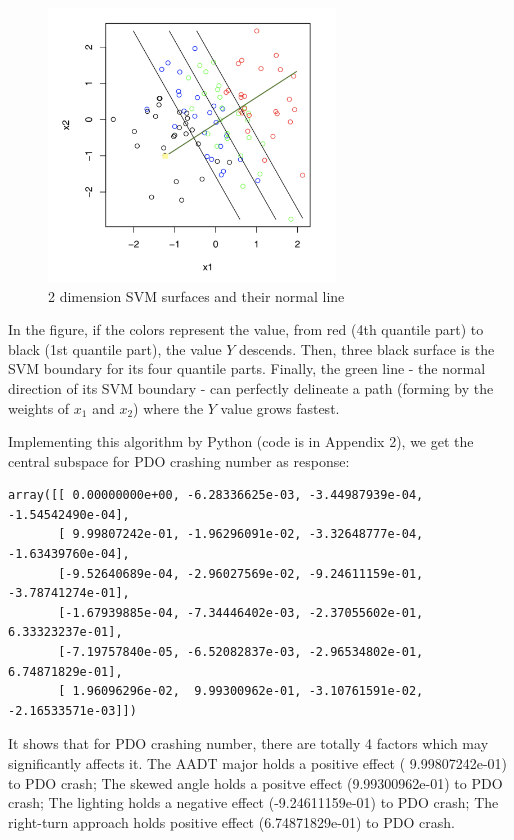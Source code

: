 \documentclass[11pt]{scrartcl} %
\begin{document}
\begin{figure}[H]
\centering
\includegraphics[width=3in]{image/psvm.png}
\small
\caption{2 dimension SVM surfaces and their normal line}
\end{figure}

In the figure, if the colors represent the value, from red (4th quantile part) to black (1st quantile part), the value $Y$ descends. Then, three black surface is the SVM boundary for its four quantile parts. Finally, the green line - the normal direction of its SVM boundary - can perfectly delineate a path (forming by the weights of $x_1$ and $x_2$) where the $Y$ value grows fastest.

\par

Implementing this algorithm by Python (code is in Appendix 2), we get the central subspace for PDO crashing number as response:

\begin{lstlisting}
array([[ 0.00000000e+00, -6.28336625e-03, -3.44987939e-04, -1.54542490e-04],
       [ 9.99807242e-01, -1.96296091e-02, -3.32648777e-04, -1.63439760e-04],
       [-9.52640689e-04, -2.96027569e-02, -9.24611159e-01, -3.78741274e-01],
       [-1.67939885e-04, -7.34446402e-03, -2.37055602e-01, 6.33323237e-01],
       [-7.19757840e-05, -6.52082837e-03, -2.96534802e-01, 6.74871829e-01],
       [ 1.96096296e-02,  9.99300962e-01, -3.10761591e-02, -2.16533571e-03]])
\end{lstlisting}

\par

It shows that for PDO crashing number, there are totally 4 factors which may significantly affects it. The AADT major holds a positive effect ( 9.99807242e-01) to PDO crash; The skewed angle holds a positve effect (9.99300962e-01) to PDO crash; The lighting holds a negative effect (-9.24611159e-01) to PDO crash; The right-turn approach holds positive effect (6.74871829e-01) to PDO crash.
\end{document}

